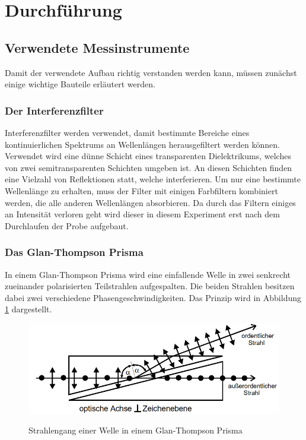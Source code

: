 \section{Durchführung}
\subsection{Verwendete Messinstrumente}
Damit der verwendete Aufbau richtig verstanden werden kann, müssen zunächst
einige wichtige Bauteile erläutert werden.
\subsubsection{Der Interferenzfilter}
Interferenzfilter werden verwendet, damit bestimmte Bereiche eines
kontinuierlichen Spektrums an Wellenlängen herausgefiltert werden können.
Verwendet wird eine dünne Schicht eines transparenten Dielektrikums, welches
von zwei semitransparenten Schichten umgeben ist. An diesen Schichten finden
eine Vielzahl von Reflektionen statt, welche interferieren. Um nur eine bestimmte
Wellenlänge zu erhalten, muss der Filter mit einigen Farbfiltern kombiniert
werden, die alle anderen Wellenlängen absorbieren. Da durch das Filtern einiges
an Intensität verloren geht wird dieser in diesem Experiment erst nach dem
Durchlaufen der Probe aufgebaut.

\subsubsection{Das Glan-Thompson Prisma}
In einem Glan-Thompson Prisma wird eine einfallende Welle in zwei senkrecht
zueinander polarisierten Teilstrahlen aufgespalten. Die beiden Strahlen
besitzen dabei zwei verschiedene Phasengeschwindigkeiten. Das Prinzip wird in
Abbildung \ref{fig:glan} dargestellt.

\begin{figure}[H]
  \centering
  \includegraphics[width=12cm, height=4cm]{glanthom.png}
  \caption{Strahlengang einer Welle in einem Glan-Thompson Prisma}
  \label{fig:glan}
  \cite{skript}
\end{figure}

